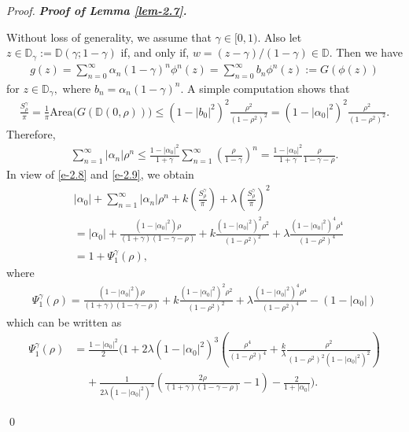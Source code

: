 \documentclass[a4paper,12pt]{amsart}
\theoremstyle{plain}
\theoremstyle{definition}
\newenvironment{pf}[1][]{%
 \vskip 3mm
 \noindent
 \ifthenelse{\equal{#1}{}}%
  {{\slshape Proof. }}%
  {{\slshape #1.} }%
 }%
{\qed\bigskip}
\begin{document}
\begin{pf}[\bf Proof of Lemma \ref{lem-2.7}]
	Without loss of generality, we assume that $ \gamma\in [0,1) $. Also let $ z\in\mathbb{D}_{\gamma}:=\mathbb{D}(\gamma;1-\gamma) $ if, and only if, $ w=(z-\gamma)/(1-\gamma)\in\mathbb{D}. $
	Then we have 
	\begin{align*}
		g(z)=\sum_{n=0}^{\infty}\alpha_n(1-\gamma)^n\phi^n(z)=\sum_{n=0}^{\infty}b_n\phi^n(z):=G(\phi(z))
	\end{align*}
	for $ z\in \mathbb{D}_{\gamma}, $ where $ b_n= \alpha_{n} (1-\gamma)^n$. A simple computation shows that
	\begin{align}\label{e-2.8}
		\frac{S^{\gamma}_{\rho}}{\pi}=\frac{1}{\pi}\text{Area}\bigg(G(\mathbb{D}(0,\rho))\bigg)\leq (1-|b_0|^2)^2\frac{\rho^2}{(1-\rho^2)^2}=(1-|\alpha_0|^2)^2\frac{\rho^2}{(1-\rho^2)^2}.
	\end{align}
	Therefore,
	\begin{align}\label{e-2.9}
		\sum_{n=1}^{\infty}|\alpha_n|\rho^n\leq\frac{1-|\alpha_0|^2}{1+\gamma}\sum_{n=1}^{\infty}\left(\frac{\rho}{1-\gamma}\right)^n=\frac{1-|\alpha_0|^2}{1+\gamma}\frac{\rho}{1-\gamma-\rho}.
	\end{align}
	In view of \eqref{e-2.8} and \eqref{e-2.9}, we obtain 
	\begin{align*} &
		|\alpha_0|+	\sum_{n=1}^{\infty}|\alpha_n|\rho^n+k\left(\frac{S^{\gamma}_{\rho}}{\pi}\right)+\lambda\left(\frac{S^{\gamma}_{\rho}}{\pi}\right)^2\\&= |\alpha_0|+\frac{(1-|\alpha_0|^2)\rho}{(1+\gamma)(1-\gamma-\rho)}+k\frac{(1-|\alpha_0|^2)^2\rho^2}{(1-\rho^2)^2}+\lambda\frac{(1-|\alpha_0|^2)^4\rho^4}{(1-\rho^2)^4}\\&= 1+\Psi_1^{\gamma}(\rho),
	\end{align*}
	where 
	\begin{align*}
		\Psi_1^{\gamma}(\rho)=\frac{(1-|\alpha_0|^2)\rho}{(1+\gamma)(1-\gamma-\rho)}+k\frac{(1-|\alpha_0|^2)^2\rho^2}{(1-\rho^2)^2}+\lambda\frac{(1-|\alpha_0|^2)^4\rho^4}{(1-\rho^2)^4}-(1-|\alpha_0|)
	\end{align*}
	which can be written as 
	\begin{align*} 
		\Psi_1^{\gamma}(\rho)&=\frac{1-|\alpha_0|^2}{2}\bigg(1+2\lambda(1-|\alpha_0|^2)^3 \left(\frac{\rho^4}{(1-\rho^2)^4}+\frac{k}{\lambda}\frac{\rho^2}{(1-\rho^2)^2(1-|\alpha_0|^2)^2}\right)\\&\;\;\;\;+\frac{1}{2\lambda(1-|\alpha_0|^2)^3}\left(\frac{2\rho}{(1+\gamma)(1-\gamma-\rho)}-1\right)-\frac{2}{1+|\alpha_0|}\bigg).
	\end{align*}

\end{pf}
\end{document}
